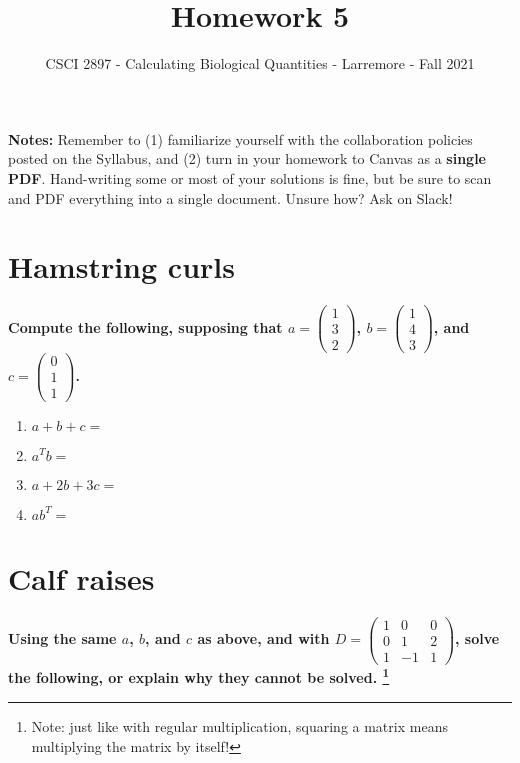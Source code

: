 \documentclass[11pt,onecolumn,superscriptaddress,notitlepage]{article}
\date{}
\begin{document}
\author{CSCI 2897 - Calculating Biological Quantities - Larremore - Fall 2021}
\title{Homework 5}
\maketitle

{\bf Notes:} Remember to (1) familiarize yourself with the collaboration policies posted on the Syllabus, and (2) turn in your homework to Canvas as a {\bf single PDF}. Hand-writing some or most of your solutions is fine, but be sure to scan and PDF everything into a single document. Unsure how? Ask on Slack! 

\section*{Hamstring curls}

{\bf Compute the following, supposing that 
$a=
\begin{pmatrix}
1 \\ 
3 \\
2
\end{pmatrix}$,
$b=
\begin{pmatrix}
1 \\ 
4 \\
3
\end{pmatrix}$, and  
$c=
\begin{pmatrix}
0 \\ 
1 \\
1
\end{pmatrix}$. 
} 

\begin{enumerate}
	\item $a+b+c = $
	\item $a^{T}b = $
	\item $a+2b+3c = $
	\item $a b^{T} = $
\end{enumerate}

\section*{Calf raises} 

{\bf Using the same $a$, $b$, and $c$ as above, and with 
$D=
\begin{pmatrix}
1 & 0 &0  \\ 
0 & 1 & 2\\
1 & -1& 1
\end{pmatrix}$, solve the following, or explain why they cannot be solved. \footnote{Note: just like with regular multiplication, squaring a matrix means multiplying the matrix by itself!}}
\end{document}
